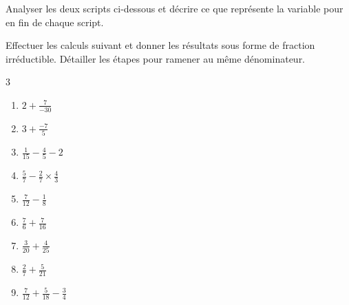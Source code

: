\documentclass[main.tex]{subfiles}
\begin{document}
\begin{exercise} 
Analyser les deux scripts ci-dessous  et décrire ce que représente la variable  pour  en fin de chaque script.
 
\noindent\parbox{0.45\linewidth}{
	\begin{scratch}[scale=0.8 ,num blocks=true,print, fill blocks, fill gray=0.95] 
		{ 
			{}
		}
	\end{scratch}
}\hfill
\parbox{0.45\linewidth}{
	\begin{scratch}[scale=0.8 ,num blocks=true,print, fill blocks, fill gray=0.95] 
	{ 
			{}
	}
\end{scratch}
} 
\end{exercise}


\begin{exercise}\hfill 
	
	Effectuer les calculs suivant et donner les résultats sous forme de fraction irréductible. Détailler les étapes pour ramener au même dénominateur.
	\begin{multicols}{3}
		\begin{enumerate}[label={$\alph*=$\rule{0pt}{1.6em}}]
			\item $2+\frac{7}{-30}$
			\item $3+\frac{-7}{5}$
			\item $\frac{1}{15}-\frac{4}{5}-2$ 
			\item $\frac{5}{7}-\frac{2}{7}\times \frac{4}{3}$
			\item $\frac{7}{12}-\frac{1}{8}$
			\item $\frac{7}{6}+\frac{7}{16}$
			\item $\frac{3}{20}+\frac{4}{25}$
			\item$\frac{2}{7}+\frac{5}{21}$
			\item$\frac{7}{12}+\frac{5}{18}-\frac{3}{4}$
		\end{enumerate}
	\end{multicols} 
\end{exercise} 
\end{document}
